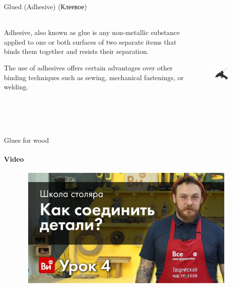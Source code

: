 \documentclass[aspectratio=169]{beamer}
\begin{document}
\begin{frame}[t]{Glued (Adhesive) (Клеевое)}
    \framesubtitle{}
    \begin{columns}[T,onlytextwidth]
        \begin{column}{0.49\textwidth}
            Adhesive, also known as glue is any non-metallic substance applied to one or both surfaces of two separate items that binds them together and resists their separation.

            The use of adhesives offers certain advantages over other binding techniques such as sewing, mechanical fastenings, or welding.
        \end{column}
        \begin{column}{0.49\textwidth}
            \begin{figure}[H]
                \centering\includegraphics[height=5cm,width=1\textwidth,keepaspectratio]{glue_gun.jpg}
                \label{fig:glue_gun.jpg}
            \end{figure}
        \end{column}
    \end{columns}
\end{frame}

\begin{frame}[t]{Glues for wood}
    \framesubtitle{Video}
    \vspace{-0.6cm}
    \begin{figure}[H]
        \href{https://youtu.be/pOXIaV024fc}{
            \centering\includegraphics[height=6cm,width=1\textwidth,keepaspectratio]{glue_video.jpg}}
        \label{fig:glue_video.jpg}
    \end{figure}
\end{frame}
\end{document}
